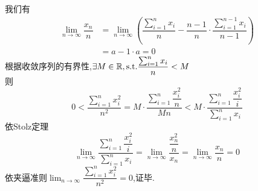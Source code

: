 \documentclass{ctexart}
\begin{document}
\begin{solution}[Proof.]
    我们有
    \begin{align*}
    \lim_{n\to\infty}{\dfrac{x_n}{n}} 
    &= \lim_{n\to\infty}{\left(\dfrac{\sum_{i=1}^{n}{x_i}}{n}-\dfrac{n-1}{n}\cdot\dfrac{\sum_{i=1}^{n-1}{x_i}}{n-1}\right)} \\
    &= a-1\cdot a= 0
    \end{align*}
    根据收敛序列的有界性,$\exists M\in\mathbb{R},\text{s.t.}\dfrac{\sum_{i=1}^{n}{x_i}}{n}<M$\\
    则$$0<\dfrac{\sum_{i=1}^{n}{x_i^2}}{n^2}=M\cdot\dfrac{\sum_{i=1}^{n}{\dfrac{x_i^2}{n}}}{Mn}<M\cdot\dfrac{\sum_{i=1}^{n}{\dfrac{x_i^2}{i}}}{\sum_{i=1}^{n}{x_i}}$$
    依Stolz定理$$\lim_{n\to\infty}{\dfrac{\sum_{i=1}^{n}{\dfrac{x_i^2}{i}}}{\sum_{i=1}^{n}{x_i}}}=\lim_{n\to\infty}{\dfrac{\dfrac{x_n^2}{n}}{x_n}}=\lim_{n\to\infty}{\dfrac{x_n}{n}}=0$$
    依夹逼准则$\displaystyle\lim_{n\to\infty}{\dfrac{\sum_{i=1}^{n}{x_i^2}}{n^2}}=0$,证毕.\\
\end{solution}
\end{document}
